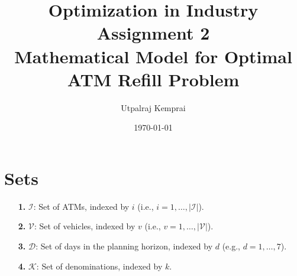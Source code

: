 \documentclass[11pt]{article}
\begin{document}
\title{Optimization in Industry Assignment 2
\\Mathematical Model for Optimal ATM Refill Problem}
\author{Utpalraj Kemprai}
\date{\today}
\maketitle

\section*{Sets}
\begin{itemize}[leftmargin=1.5cm]
    \item[\textbf{1.}] \(\mathcal{I}\): Set of ATMs, indexed by \(i\) (i.e., \(i=1,\dots,|\mathcal{I}|\)).
    \item[\textbf{2.}] \(\mathcal{V}\): Set of vehicles, indexed by \(v\) (i.e., \(v=1,\dots,|\mathcal{V}|\)).
    \item[\textbf{3.}] \(\mathcal{D}\): Set of days in the planning horizon, indexed by \(d\) (e.g., \(d=1,\dots,7\)).
    \item[\textbf{4.}] \(\mathcal{K}\): Set of denominations, indexed by \(k\).
\end{itemize}
\end{document}
